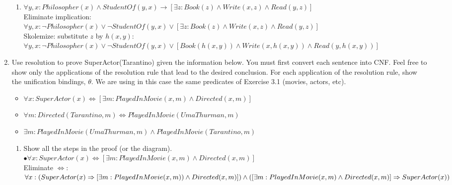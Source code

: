 \documentclass[paper=a4, fontsize=11pt]{scrartcl} %
\numberwithin{equation}{section} %
\numberwithin{figure}{section} %
\numberwithin{table}{section} %
\begin{document}
\begin{enumerate}
\begin{enumerate}
		\item
		$\forall y,x: Philosopher(x) \wedge StudentOf(y,x) \rightarrow [\exists z: Book(z) \wedge Write(x,z) \wedge Read(y,z)]$\\
		
		Eliminate implication:\\
		$\forall y,x: \neg Philosopher(x) \vee \neg StudentOf(y,x) \vee [\exists z: Book(z) \wedge Write(x,z) \wedge Read(y,z)]$\\

		Skolemize: substitute $z$ by $h(x,y)$:\\
		$\forall y,x: \neg Philosopher(x) \vee \neg StudentOf(y,x) \vee [Book(h(x,y)) \wedge Write(x,h(x,y)) \wedge Read(y,h(x,y))]$\\
	\end{enumerate}
	\item
	Use resolution to prove SuperActor(Tarantino) given the information below. 
	You must first convert each sentence into CNF. 
	Feel free to show only the applications of the resolution rule that lead to the desired conclusion. 
	For each application of the resolution rule, show the unification bindings, $\theta$. 
	We are using in this case the same predicates of Exercise 3.1 (movies, actors, etc).
	\begin{itemize}
		\item 
		$\forall x: SuperActor(x) \Leftrightarrow [\exists m: PlayedInMovie(x,m) \wedge Directed(x,m)]$
		\item
		$\forall m: Directed(Tarantino,m) \Leftrightarrow PlayedInMovie(UmaThurman,m)$
		\item
		$\exists m: PlayedInMovie(UmaThurman,m) \wedge PlayedInMovie(Tarantino,m)$
	\end{itemize}
	\begin{enumerate}
		\item
		Show all the steps in the proof (or the diagram).\\
		
			$\bullet \forall x: SuperActor(x) \Leftrightarrow [\exists m: PlayedInMovie(x,m) \wedge Directed(x,m)]$\\
			Eliminate $\Leftrightarrow$:\\

			$\forall x: (SuperActor(x) \Rightarrow [\exists m: PlayedInMovie(x,m)) \wedge Directed(x,m)]) \wedge \\
			([\exists m: PlayedInMovie(x,m) \wedge Directed(x,m)] \Rightarrow SuperActor(x))$\\
			

\end{enumerate}
\end{enumerate}
\end{document}
